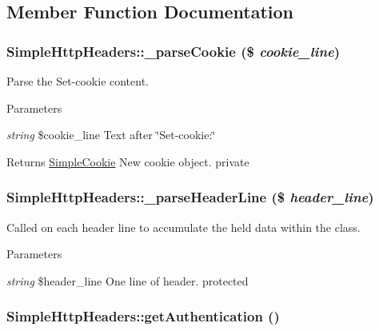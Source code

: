 \subsection{Member Function Documentation}
\hypertarget{class_simple_http_headers_a1a67c80f10adc9c369aec874b4af8b1b}{
\subsubsection[{\_\-parseCookie}]{\setlength{\rightskip}{0pt plus 5cm}SimpleHttpHeaders::\_\-parseCookie (\$ {\em cookie\_\-line})}}
\label{class_simple_http_headers_a1a67c80f10adc9c369aec874b4af8b1b}
Parse the Set-\/cookie content. 
\begin{DoxyParams}{Parameters}
\item[{\em string}]\$cookie\_\-line Text after \char`\"{}Set-\/cookie:\char`\"{} \end{DoxyParams}
\begin{DoxyReturn}{Returns}
\hyperlink{class_simple_cookie}{SimpleCookie} New cookie object.  private 
\end{DoxyReturn}
\hypertarget{class_simple_http_headers_a86d1882d85c1eaae584389445ac9a817}{
\subsubsection[{\_\-parseHeaderLine}]{\setlength{\rightskip}{0pt plus 5cm}SimpleHttpHeaders::\_\-parseHeaderLine (\$ {\em header\_\-line})}}
\label{class_simple_http_headers_a86d1882d85c1eaae584389445ac9a817}
Called on each header line to accumulate the held data within the class. 
\begin{DoxyParams}{Parameters}
\item[{\em string}]\$header\_\-line One line of header.  protected \end{DoxyParams}
\hypertarget{class_simple_http_headers_a7204275d75685916a8f4b420d3de1d79}{
\subsubsection[{getAuthentication}]{\setlength{\rightskip}{0pt plus 5cm}SimpleHttpHeaders::getAuthentication ()}}
